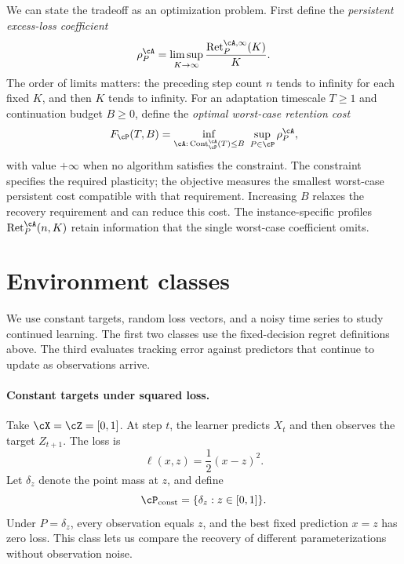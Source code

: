 \documentclass[11pt,twoside]{article}
\theoremstyle{definition}
\theoremstyle{remark}
\DeclareMathOperator{\Cont}{Cont}
\DeclareMathOperator{\Ret}{Ret}
\begin{document}
We can state the tradeoff as an optimization problem. First define the
\emph{persistent excess-loss coefficient}
\begin{equation}
 \rho_P^\cA=\limsup_{K\to\infty}
       \frac{\Ret_P^{\cA,\infty}(K)}{K}.
 \label{eq:retention-coefficient}
\end{equation}
The order of limits matters: the preceding step count $n$ tends to infinity
for each fixed $K$, and then $K$ tends to infinity. For an adaptation
timescale $T\ge1$ and continuation budget $B\ge0$, define the
\emph{optimal worst-case retention cost}
\begin{equation}
 F_{\cP}(T,B)=
 \inf_{\cA:\,\Cont_{\cP}^{\cA}(T)\le B}\ \sup_{P\in\cP}\rho_P^\cA,
 \label{eq:frontier}
\end{equation}
with value $+\infty$ when no algorithm satisfies the constraint.
The constraint specifies the required plasticity; the objective measures
the smallest worst-case persistent cost compatible with that requirement.
Increasing $B$ relaxes the recovery requirement and can reduce this cost.
The instance-specific profiles $\Ret_P^\cA(n,K)$ retain information that
the single worst-case coefficient omits.

\section{Environment classes}
\label{sec:environments}

We use constant targets, random loss vectors, and a noisy time series to
study continued learning. The first two classes use the fixed-decision
regret definitions above. The third evaluates tracking error against
predictors that continue to update as observations arrive.

\paragraph{Constant targets under squared loss.}
Take $\cX=\cZ=[0,1]$. At step $t$, the learner predicts $X_t$ and
then observes the target $Z_{t+1}$. The loss is
\begin{equation}
 \ell(x,z)=\frac12(x-z)^2.
 \label{eq:square-loss}
\end{equation}
Let $\delta_z$ denote the point mass at $z$, and define
\[
 \cP_{\rm const}=\{\delta_z:z\in[0,1]\}.
\]
Under $P=\delta_z$, every observation equals $z$, and the best fixed
prediction $x=z$ has zero loss. This class lets us compare the recovery
of different parameterizations without observation noise.
\end{document}

